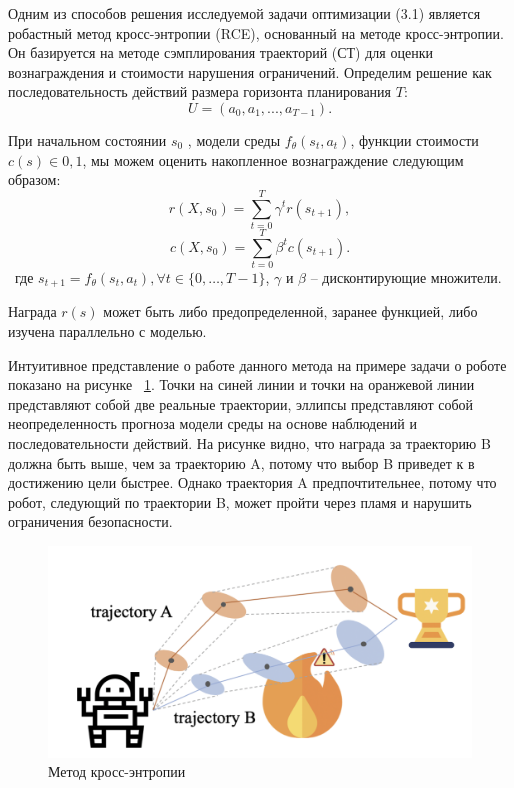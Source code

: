 Одним из способов решения исследуемой задачи оптимизации (3.1) является робастный метод кросс-энтропии (RCE), основанный на методе кросс-энтропии. Он базируется на  методе сэмплирования траекторий (СТ)  \cite{cem1} для оценки вознаграждения и стоимости нарушения ограничений. Определим решение как последовательность действий размера 
горизонта планирования $T$:
 $$U = (a_0, a_1, ..., a_{T −1}).$$  
 
При начальном состоянии $s_0$ , модели среды $f_{\theta}(s_t, a_t)$, функции стоимости  $c(s) \in {0, 1}$, мы можем оценить накопленное вознаграждение следующим образом:
$$r(X, s_0) = \sum\limits_{t=0}^T \gamma^t r(s_{t+1}),$$
$$c(X, s_0) = \sum\limits_{t=0}^T \beta^t c(s_{t+1}) .$$
 где $s_{t+1} = f_{\theta}(s_t, a_t), \forall  t \in \{0, \dots, T-1\}$, $\gamma$ и $\beta$ -- дисконтирующие множители. 

Награда $r(s)$ может быть либо предопределенной, заранее функцией, либо изучена параллельно с моделью.  

Интуитивное представление о работе данного метода на примере задачи о роботе показано на рисунке ~\ref{fig:cross-ent}. Точки на синей линии и точки на оранжевой линии представляют собой две реальные траектории, эллипсы
представляют собой неопределенность прогноза модели среды на основе наблюдений и последовательности действий. На рисунке видно, что награда за траекторию B должна быть выше, чем за траекторию A, потому что выбор B приведет к в достижению цели быстрее. Однако траектория A предпочтительнее, потому что робот, следующий по траектории B, может пройти
через пламя и нарушить ограничения безопасности.


\begin{figure}[h]
	\centering
	\includegraphics[scale=0.5]{cem_alg.png}	
	\caption {Метод кросс-энтропии}
	\label{fig:cross-ent}
\end{figure}


